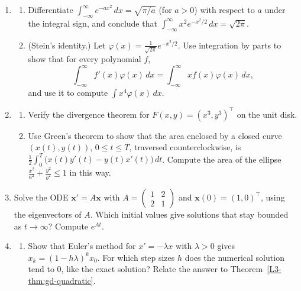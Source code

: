 \begin{enumerate}[leftmargin=*]
\begin{enumerate}[label=(\alph*)]
        \item A random point $\mathbf{X}$ is uniformly distributed on the unit disk, i.e., it has the density $\frac{1}{\pi}$ on the disk and $0$ outside. Use polar coordinates to compute its average distance $\int \frac{1}{\pi}\norm{\mathbf{x}}\, d\mathbf{x}$ from the center. Find the density of the first coordinate $X_1$ by integrating out $x_2$.
    \end{enumerate}
    \item \begin{enumerate}[label=(\alph*)]
        \item Differentiate $\int_{-\infty}^\infty e^{-ax^2}\, dx = \sqrt{\pi/a}$ (for $a > 0$) with respect to $a$ under the integral sign, and conclude that $\int_{-\infty}^\infty x^2e^{-x^2/2}\, dx = \sqrt{2\pi}$.
        \item (Stein's identity.) Let $\varphi(x) = \frac{1}{\sqrt{2\pi}}e^{-x^2/2}$. Use integration by parts to show that for every polynomial $f$,
        \[\int_{-\infty}^\infty f'(x)\varphi(x)\, dx = \int_{-\infty}^\infty xf(x)\varphi(x)\, dx,\]
        and use it to compute $\int x^4\varphi(x)\, dx$.
    \end{enumerate}
    \item \begin{enumerate}[label=(\alph*)]
        \item Verify the divergence theorem for $F(x, y) = (x^3, y^3)^\top$ on the unit disk.
        \item Use Green's theorem to show that the area enclosed by a closed curve $(x(t), y(t))$, $0 \leq t \leq T$, traversed counterclockwise, is $\frac{1}{2}\int_0^T \big(x(t)y'(t) - y(t)x'(t)\big)\, dt$. Compute the area of the ellipse $\frac{x^2}{a^2} + \frac{y^2}{b^2} \leq 1$ in this way.
    \end{enumerate}
    \item Solve the ODE $\mathbf{x}' = A\mathbf{x}$ with $A = \begin{pmatrix} 1 & 2 \\ 2 & 1 \end{pmatrix}$ and $\mathbf{x}(0) = (1, 0)^\top$, using the eigenvectors of $A$. Which initial values give solutions that stay bounded as $t \to \infty$? Compute $e^{At}$.
    \item\label{L3-ex3:euler-skew} \homework{} \begin{enumerate}[label=(\alph*)]
        \item Show that Euler's method for $x' = -\lambda x$ with $\lambda > 0$ gives $x_k = (1 - h\lambda)^k x_0$. For which step sizes $h$ does the numerical solution tend to $0$, like the exact solution? Relate the answer to Theorem~\ref{L3-thm:gd-quadratic}.

\end{enumerate}
\end{enumerate}
